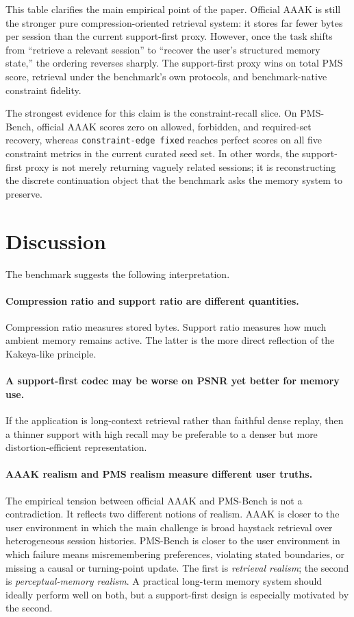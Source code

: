 \documentclass[11pt]{article}
\begin{document}
This table clarifies the main empirical point of the paper. Official AAAK is still the stronger pure compression-oriented retrieval system: it stores far fewer bytes per session than the current support-first proxy. However, once the task shifts from ``retrieve a relevant session'' to ``recover the user's structured memory state,'' the ordering reverses sharply. The support-first proxy wins on total PMS score, retrieval under the benchmark's own protocols, and benchmark-native constraint fidelity.

The strongest evidence for this claim is the constraint-recall slice. On PMS-Bench, official AAAK scores zero on allowed, forbidden, and required-set recovery, whereas \texttt{constraint-edge fixed} reaches perfect scores on all five constraint metrics in the current curated seed set. In other words, the support-first proxy is not merely returning vaguely related sessions; it is reconstructing the discrete continuation object that the benchmark asks the memory system to preserve.

\section{Discussion}
The benchmark suggests the following interpretation.

\paragraph{Compression ratio and support ratio are different quantities.}
Compression ratio measures stored bytes. Support ratio measures how much ambient memory remains active. The latter is the more direct reflection of the Kakeya-like principle.

\paragraph{A support-first codec may be worse on PSNR yet better for memory use.}
If the application is long-context retrieval rather than faithful dense replay, then a thinner support with high recall may be preferable to a denser but more distortion-efficient representation.

\paragraph{AAAK realism and PMS realism measure different user truths.}
The empirical tension between official AAAK and PMS-Bench is not a contradiction. It reflects two different notions of realism. AAAK is closer to the user environment in which the main challenge is broad haystack retrieval over heterogeneous session histories. PMS-Bench is closer to the user environment in which failure means misremembering preferences, violating stated boundaries, or missing a causal or turning-point update. The first is \emph{retrieval realism}; the second is \emph{perceptual-memory realism}. A practical long-term memory system should ideally perform well on both, but a support-first design is especially motivated by the second.
\end{document}

